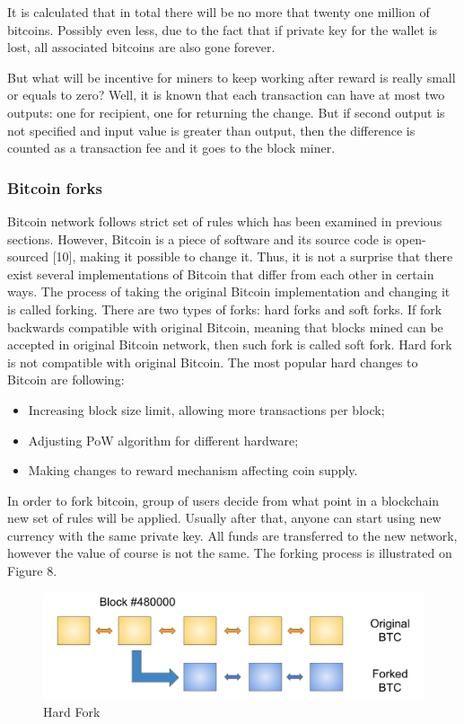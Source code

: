 \documentclass[conference,compsoc]{IEEEtran}
\begin{document}
It is calculated that in total there will be no more that twenty one million of bitcoins. 
Possibly even less, due to the fact that if private key for the wallet is lost, all associated bitcoins are also gone forever. 

But what will be incentive for miners to keep working after reward is really small or equals to zero? 
Well, it is known that each transaction can have at most two outputs: one for recipient, one for returning the change. 
But if second output is not specified and input value is greater than output, then the difference is counted as a transaction fee and it goes to the block miner.

\subsubsection{Bitcoin forks}
Bitcoin network follows strict set of rules which has been examined in previous sections.
However, Bitcoin is a piece of software and its source code is open-sourced [10], making it possible to change it. 
Thus, it is not a surprise that there exist several implementations of Bitcoin that differ from each other in certain ways.
The process of taking the original Bitcoin implementation and changing it is called forking. 
There are two types of forks: hard forks and soft forks. 
If fork backwards compatible with original Bitcoin, meaning that blocks mined can be accepted in original Bitcoin network, then such fork is called soft fork. 
Hard fork is not compatible with original Bitcoin. 
The most popular hard changes to Bitcoin are following:

\begin{itemize}
    \item Increasing block size limit, allowing more transactions per block;
    \item Adjusting PoW algorithm for different hardware;
    \item Making changes to reward mechanism affecting coin supply.
\end{itemize}

In order to fork bitcoin, group of users decide from what point in a blockchain new set of rules will be applied. 
Usually after that, anyone can start using new currency with the same private key. 
All funds are transferred to the new network, however the value of course is not the same. 
The forking process is illustrated on Figure 8.

\begin{figure}[h]
  \centering
  \includegraphics[width=.45\textwidth]{graphics/fork.png}
  \caption{Hard Fork}
  \label{fig:fig8}
\end{figure}
\end{document}
